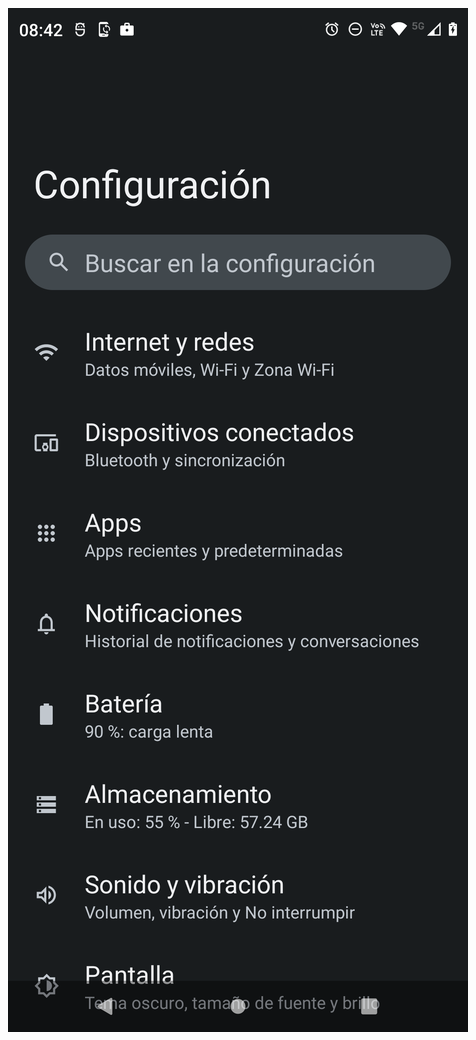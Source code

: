 \begin{frame}
\begin{columns}
\begin{center}
\end{center}
\begin{center}
\includegraphics[width=0.95\linewidth]{00_Configurar/ModoDesarrollador2.png}    

\end{center}
\end{columns}
\end{frame}
